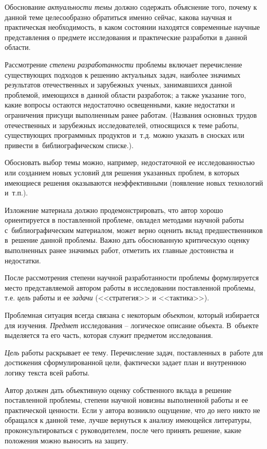 \documentclass[PI,VKR]{HSEUniversityPractice}
\begin{document}
Обоснование \emph{актуальности темы} должно содержать объяснение того, почему к данной теме целесообразно обратиться именно сейчас, какова научная и практическая необходимость, в каком состоянии находятся современные научные представления о предмете исследования и практические разработки в данной области.

Рассмотрение \emph{степени разработанности} проблемы включает перечисление существующих подходов к решению актуальных задач, наиболее значимых результатов отечественных и зарубежных ученых, занимавшихся данной проблемой, имеющихся в данной области разработок; а также указание того, какие вопросы остаются недостаточно освещенными, какие недостатки и ограничения присущи выполненным ранее работам. (Названия основных трудов отечественных и зарубежных исследователей, относящихся к теме работы, существующих программных продуктов и т.д. можно указать в сносках или привести в библиографическом списке.).

Обосновать выбор темы можно, например, недостаточной ее исследованностью или созданием новых условий для решения указанных проблем, в которых имеющиеся решения оказываются неэффективными (появление новых технологий и т.п.).

Изложение материала должно продемонстрировать, что автор хорошо ориентируется в поставленной проблеме, овладел методами научной работы с библиографическим материалом, может верно оценить вклад предшественников в решение данной проблемы. Важно дать обоснованную критическую оценку выполненных ранее значимых работ, отметить их главные достоинства и недостатки. 

После рассмотрения степени научной разработанности проблемы формулируется место представляемой автором работы в исследовании поставленной проблемы, т.е. \emph{цель} работы и ее \emph{задачи} (<<стратегия>> и <<тактика>>).

Проблемная ситуация всегда связана с некоторым \emph{объектом}, который избирается для изучения. \emph{Предмет} исследования – логическое описание объекта. В объекте выделяется та его часть, которая служит предметом исследования.

\emph{Цель} работы раскрывает ее тему. Перечисление задач, поставленных в работе для достижения сформулированной цели, фактически задает план и внутреннюю логику текста всей работы. 

Автор должен дать объективную оценку собственного вклада в решение поставленной проблемы, степени научной новизны выполненной работы и ее практической ценности. Если у автора возникло ощущение, что до него никто не обращался к данной теме, лучше вернуться к анализу имеющейся литературы, проконсультироваться с руководителем, после чего принять решение, какие положения можно выносить на защиту. 
\end{document}
